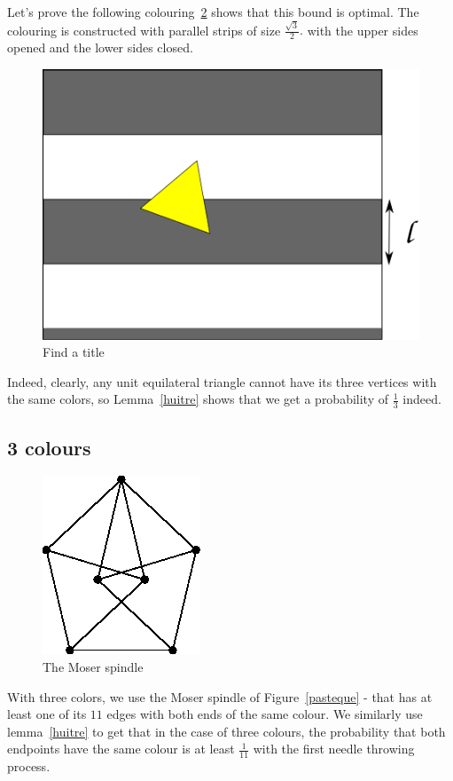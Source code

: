 \documentclass[a4paper,11pt]{article}
\theoremstyle{definition}
\theoremstyle{remark}
\begin{document}
Let's prove the following colouring~\ref{color} shows that this bound is 
optimal. The colouring is constructed with parallel strips of size 
$\frac {\sqrt3}{2}.$ with the upper sides opened and the lower sides closed.   
\begin{figure}[h]
\center
\includegraphics[scale=0.5]{path6509.png}
\caption{\label{couleur} Find a title}
\end{figure}

Indeed, clearly, any unit equilateral triangle cannot have its three vertices
with the same colors, so Lemma~\ref{huitre} shows that we get a probability of 
$\frac{1}{3}$ indeed.

\subsection{3 colours}
\begin{figure}[h]
\label{pasteque}
\center
\includegraphics[scale=0.4]{T.png}
\caption{\label{color} The Moser spindle}
\end{figure}


 With three colors, we use the Moser spindle of Figure~\ref{pasteque} - that 
 has at least one of its $11$ edges with both ends of the same colour.
 We similarly use lemma~\ref{huitre} to get that in the case of three colours,
 the probability that both endpoints have the same colour is at least 
 $\frac{1}{11}$ with the first needle throwing process. 
\end{document}
